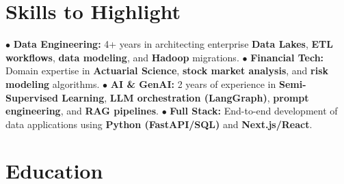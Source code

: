\documentclass[letterpaper]{twentysecondcv} %
\begin{document}
\makeprofile %

\section{Skills to Highlight}

$\bullet$ \textbf{Data Engineering:} 4+ years in architecting enterprise \textbf{Data Lakes}, \textbf{ETL workflows}, \textbf{data modeling}, and \textbf{Hadoop} migrations. \newline
$\bullet$ \textbf{Financial Tech:} Domain expertise in \textbf{Actuarial Science}, \textbf{stock market analysis}, and \textbf{risk modeling} algorithms. \newline
$\bullet$ \textbf{AI \& GenAI:} 2 years of experience in \textbf{Semi-Supervised Learning}, \textbf{LLM orchestration (LangGraph)}, \textbf{prompt engineering}, and \textbf{RAG pipelines}. \newline
$\bullet$ \textbf{Full Stack:} End-to-end development of data applications using \textbf{Python (FastAPI/SQL)} and \textbf{Next.js/React}. \newline



\section{Education}

\begin{twenty}
\end{twenty}

\end{document}
